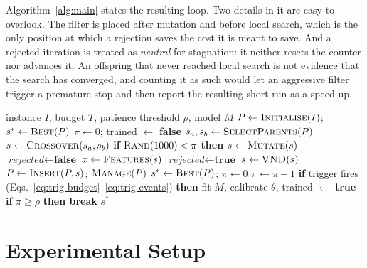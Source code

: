 \documentclass[a4paper,fleqn]{cas-dc}
\begin{document}
Algorithm~\ref{alg:main} states the resulting loop. Two details in it are easy to
overlook. The filter is placed after mutation and before local search, which is
the only position at which a rejection saves the cost it is meant to save. And a
rejected iteration is treated as \emph{neutral} for stagnation: it neither resets
the counter nor advances it. An offspring that never reached local search is not
evidence that the search has converged, and counting it as such would let an
aggressive filter trigger a premature stop and then report the resulting short
run as a speed-up.

\begin{algorithm}[htbp]
\caption{One island of the filtered memetic algorithm}
\label{alg:main}
\begin{algorithmic}[1]
\Require instance $I$, budget $T$, patience threshold $\rho$, model $M$
\State $P \gets \textsc{Initialise}(I)$; \; $s^{*} \gets \textsc{Best}(P)$
\State $\pi \gets 0$; \; trained $\gets$ \textbf{false}
  \State $s_a, s_b \gets \textsc{SelectParents}(P)$
  \State $s \gets \textsc{Crossover}(s_a, s_b)$
  \State \textbf{if} $\textsc{Rand}(1000) < \pi$ \textbf{then}
         $s \gets \textsc{Mutate}(s)$
  \State $\textit{rejected} \gets \textbf{false}$
    \State $x \gets \textsc{Features}(s)$
      \State $\textit{rejected} \gets \textbf{true}$
    \EndIf
  \EndIf
    \State $s \gets \textsc{VND}(s)$
    \State $P \gets \textsc{Insert}(P, s)$; \;
           $\textsc{Manage}(P)$
  \EndIf
    \State $s^{*} \gets \textsc{Best}(P)$; \; $\pi \gets 0$
    \State $\pi \gets \pi + 1$
  \EndIf
  \State \textbf{if} trigger fires (Eqs.~\eqref{eq:trig-budget}--\eqref{eq:trig-events})
         \textbf{then} fit $M$, calibrate $\theta$, trained $\gets$ \textbf{true}
  \State \textbf{if} $\pi \geq \rho$ \textbf{then break}
\EndFor
\State \Return $s^{*}$
\end{algorithmic}
\end{algorithm}


\section{Experimental Setup}\label{sec:setup}
\end{document}
